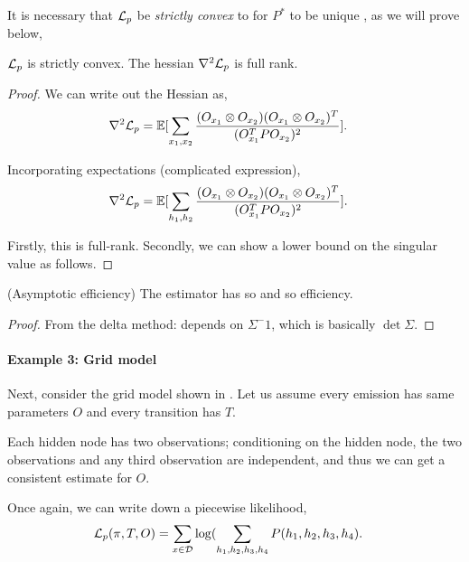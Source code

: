 It is necessary that $\mathcal{L}_p$ be {\em strictly convex} to for $P^*$ to be unique , as we will prove below,

\begin{theorem}
  $\mathcal{L}_p$ is strictly convex. The hessian $\nabla^2 \mathcal{L}_p$ is full rank. 
\end{theorem}
\begin{proof}

  We can write out the Hessian as,
\begin{align}
  \nabla^2 \mathcal{L}_p &= \mathbb{E}[ \sum_{x_1, x_2} \frac{ (O_{x_1} \otimes O_{x_2}) (O_{x_1} \otimes O_{x_2})^T }{(O_{x_1}^T P O_{x_2})^2} ].
\end{align}

  Incorporating expectations (complicated expression),
\begin{align}
  \nabla^2 \mathcal{L}_p &= \mathbb{E}[ \sum_{h_1, h_2} \frac{ (O_{x_1} \otimes O_{x_2}) (O_{x_1} \otimes O_{x_2})^T }{(O_{x_1}^T P O_{x_2})^2} ].
\end{align}

Firstly, this is full-rank. Secondly, we can show a lower bound on the singular value as follows.
\end{proof}

\begin{corollary}(Asymptotic efficiency)
  The estimator has so and so efficiency.
\end{corollary}
\begin{proof}
  From the delta method: depends on $\Sigma^-1$, which is basically $\det \Sigma$.
\end{proof}

\paragraph{Example 3: Grid model}

Next, consider the grid model shown in . Let us
assume every emission has same parameters $O$ and every transition has
$T$.

Each hidden
node has two observations; conditioning on the hidden node, the two
observations and any third observation are independent, and thus we can
get a consistent estimate for $O$.

Once again, we can write down a piecewise likelihood,
\begin{align}
  \mathcal{L}_{p}(\pi, T, O) &= \sum_{x\in\mathcal{D}} \log( \sum_{h_1, h_2, h_3, h_4} P(h_1, h_2, h_3, h_4).
\end{align}


